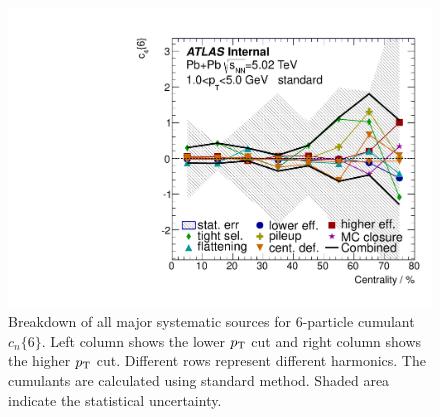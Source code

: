 \begin{figure}[H]
\includegraphics[width=.425\linewidth]{figs/chapter_appendix/sys_c6_1sub_Har4_Pt1.pdf}
\caption{Breakdown of all major systematic sources for 6-particle cumulant $c_n\{6\}$. Left column shows the lower $p_\text{T}$ cut and right column shows the higher $p_\text{T}$ cut. Different rows represent different harmonics. The cumulants are calculated using standard method. Shaded area indicate the statistical uncertainty.}
\end{figure}

